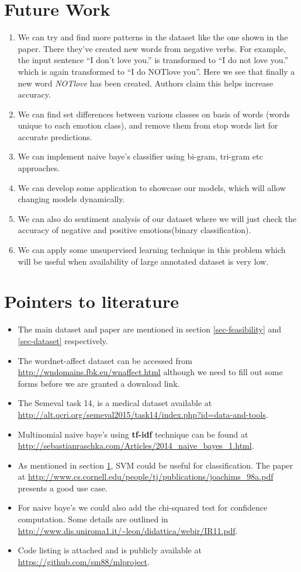 \section{Future Work}
\label{sec-plan-for-sem}
\begin{enumerate}
 \item We can try and find more patterns in the dataset like the one shown in the paper. There they've created new words from negative verbs. For example, the input sentence ``I don't love you.'' is transformed to ``I do not love you.'' which is again transformed to ``I do NOTlove you''. Here we see that finally a new word \emph{NOTlove} has been created. Authors claim this helps increase accuracy.
 \item We can find set differences between various classes on basis of words (words unique to each emotion class), and remove them from stop words list for accurate predictions.
 \item We can implement naive baye's classifier using bi-gram, tri-gram etc approaches.
 \item We can develop some application to showcase our models, which will allow changing models dynamically.
 \item We can also do sentiment analysis of our dataset where we will just check the accuracy of negative and positive emotions(binary classification).
 \item We can apply some unsupervised learning technique in this problem which will be useful when availability of large annotated dataset is very low.
\end{enumerate}
\section{Pointers to literature}
\begin{itemize}
 \item The main dataset and paper are mentioned in section \ref{sec-feasibility} and \ref{sec-dataset} respectively.
 \item The wordnet-affect dataset can be accessed from \url{http://wndomains.fbk.eu/wnaffect.html} although we need to fill out some forms before we are granted a download link.
 \item The Semeval task 14, is a medical dataset available at \url{http://alt.qcri.org/semeval2015/task14/index.php?id=data-and-tools}.
 \item Multinomial naive baye's using \textbf{tf-idf} technique can be found at \url{http://sebastianraschka.com/Articles/2014_naive_bayes_1.html}.
 \item As mentioned in section \ref{sec-plan-for-sem}, SVM could be useful for classification. The paper at \url{http://www.cs.cornell.edu/people/tj/publications/joachims_98a.pdf} presents a good use case.
 \item For naive baye's we could also add the chi-squared test for confidence computation. Some details are outlined in \url{http://www.dis.uniroma1.it/~leon/didattica/webir/IR11.pdf}.
 \item Code listing is attached and is publicly available at \url{https://github.com/sm88/mlproject}.
\end{itemize}

